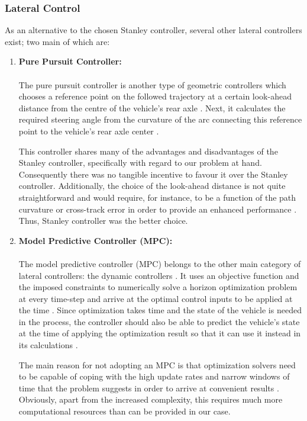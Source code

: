 \subsubsection{Lateral Control}
\label{des_lat_ctrl}
As an alternative to the chosen Stanley controller, several other lateral controllers exist; two main of which are:

\begin{enumerate}
    \item \textbf{Pure Pursuit Controller:}
\\ \\
The pure pursuit controller is another type of geometric controllers which chooses a reference point on the followed trajectory at a certain look-ahead distance from the centre of the vehicle’s rear axle \cite{article}. Next, it calculates the required steering angle from the curvature of the arc connecting this reference point to the vehicle’s rear axle center \cite{article}.

This controller shares many of the advantages and disadvantages of the Stanley controller, specifically with regard to our problem at hand. Consequently there was no tangible incentive to favour it over the Stanley controller. Additionally, the choice of the look-ahead distance is not quite straightforward and would require, for instance, to be a function of the path curvature or cross-track error in order to provide an enhanced performance \cite{article}. Thus, Stanley controller was the better choice.

    \item \textbf{Model Predictive Controller (MPC):}
\\ \\
The model predictive controller (MPC) belongs to the other main category of lateral controllers: the dynamic controllers \cite{article}. It uses an objective function and the imposed constraints to numerically solve a horizon optimization problem at every time-step and arrive at the optimal control inputs to be applied at the time \cite{4162483}. Since optimization takes time and the state of the vehicle is needed in the process, the controller should also be able to predict the vehicle’s state at the time of applying the optimization result so that it can use it instead in its calculations \cite{4162483}.

The main reason for not adopting an MPC is that optimization solvers need to be capable of coping with the high update rates and narrow windows of time that the problem suggests in order to arrive at convenient results \cite{4162483}. Obviously, apart from the increased complexity, this requires much more computational resources than can be provided in our case.
\end{enumerate}

